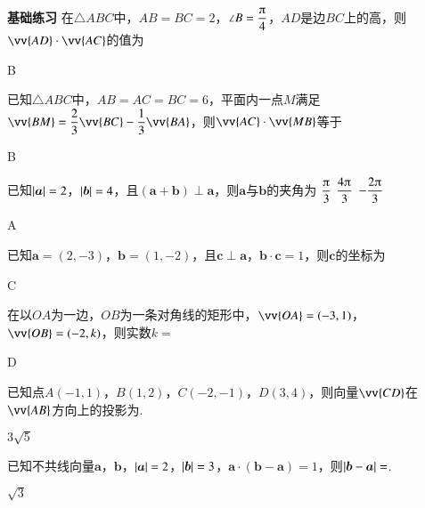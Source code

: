 \begin{Theorem}[平面向量基本定理]
\begin{exercise}{{\textbf{基础练习}}}
      在$\triangle{ABC}$中，$AB=BC=2$，$\angle{B}=\dfrac{\piup}4$，$AD$是边$BC$上的高，则$\vv{AD}\cdot\vv{AC}$的值为\xz
      \begin{answer}
        B
      \end{answer}
    \item%
      已知$\triangle{ABC}$中，$AB=AC=BC=6$，平面内一点$M$满足$\vv{BM}=\dfrac{2}3\vv{BC}-\dfrac{1}3\vv{BA}$，则$\vv{AC}\cdot\vv{MB}$等于\xz
      \begin{answer}
        B
      \end{answer}
    \item%
      已知$\left| \bm a \right|=2$，$\left| \bm b \right|=4$，且$(\bm a+\bm b)\perp \bm a$，则$\bm a$与$\bm b$的夹角为\xz
       {$\dfrac{\piup}3$}
       {$\dfrac{4\piup}3$}
       {$-\dfrac{2\piup}3$}
      \begin{answer}
        A
      \end{answer}
    \item%
      已知$\bm a=(2,-3)$，$\bm b=(1,-2)$，且$\bm c\perp \bm a$，$\bm b\cdot\bm c=1$，则$\bm c$的坐标为\xz
      \begin{answer}
        C
      \end{answer}
    \item%
      在以$OA$为一边，$OB$为一条对角线的矩形中，$\vv{OA}=(-3,1)$，$\vv{OB}=(-2,k)$，则实数$k=$\xz
      \begin{answer}
        D
      \end{answer}
    \item%
      已知点$A(-1,1)$，$B(1,2)$，$C(-2,-1)$，$D(3,4)$，则向量$\vv{CD}$在$\vv{AB}$方向上的投影为\tk.
      \begin{answer}
        $3\sqrt{5}$
      \end{answer}
    \item%
      已知不共线向量$\bm a$，$\bm b$，$\left| \bm a \right|=2$，$\left| \bm b \right|=3$，$\bm a\cdot(\bm b-\bm a)=1$，则$\left| \bm b-\bm a \right|=$\tk.
      \begin{answer}
        $\sqrt{3}$
      \end{answer}
    \item%

\end{exercise}
\end{Theorem}
